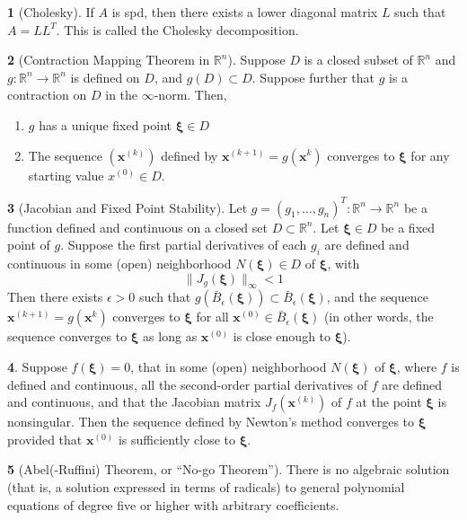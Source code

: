 \documentclass[12pt]{article}
\theoremstyle{definition}
\newtheorem{theorem}{\color{ForestGreen}{\textbf{Theorem}}}
\newcommand{\e}{\epsilon}
\newcommand{\R}{\mathbb{R}}
\newcommand{\norm}[1]{\lVert#1\rVert}
\newcommand{\x}{\bm{x}}
\newcommand{\xib}{\bm{\xi}}
\begin{document}
\begin{theorem}[Cholesky]
If $A$ is spd, then there exists a lower diagonal matrix $L$ such that $A = L L^T$. This is called the Cholesky decomposition.
\end{theorem}

\begin{theorem}[Contraction Mapping Theorem in $\R^n$]
Suppose $D$ is a closed subset of $\R^n$ and $g: \R^n \to \R^n$ is defined on $D$, and $g(D) \subset D$. Suppose further that $g$ is a contraction on $D$ in the $\infty$-norm. Then,
\begin{enumerate}
\item $g$ has a unique fixed point $\xib \in D$
\item The sequence $(\x^{(k)})$ defined by $\x^{(k+1)} = g(\x^{k})$ converges to $\xib$ for any starting value $x^{(0)} \in D$.
\end{enumerate}
\end{theorem}

\begin{theorem}[Jacobian and Fixed Point Stability]
Let $g = (g_1, \ldots, g_n)^T : \R^n \to \R^n$ be a function defined and continuous on a closed set $D \subset \R^n$. Let $\xib \in D$ be a fixed point of $g$. Suppose the first partial derivatives of each $g_i$ are defined and continuous in some (open) neighborhood $N(\xib) \in D$ of $\xib$, with
\begin{equation}
\norm{J_g(\xib)}_\infty < 1
\end{equation}
Then there exists $\e > 0$ such that $g (\bar B_\e(\xib)) \subset \bar B_\e(\xib)$, and the sequence $\x^{(k+1)} = g(\x^{k})$ converges to $\xib$ for all $\x^{(0)} \in \bar B_\e(\xib)$ (in other words, the sequence converges to $\xib$ as long as $\x^{(0)}$ is close enough to $\xib$).
\end{theorem}

\begin{theorem}
Suppose $f(\xib) = 0$, that in some (open) neighborhood $N(\xib)$ of $\xib$, where $f$ is defined and continuous, all the second-order partial derivatives of $f$ are defined and continuous, and that the Jacobian matrix $J_f(\x^{(k)})$ of $f$ at the point $\xib$ is nonsingular. Then the sequence defined by Newton's method converges to $\xib$ provided that $\x^{(0)}$ is sufficiently close to $\xib$.
\end{theorem}

\begin{theorem}[Abel(-Ruffini) Theorem, or ``No-go Theorem'']
There is no algebraic solution (that is, a solution expressed in terms of radicals) to general polynomial equations of degree five or higher with arbitrary coefficients.
\end{theorem}
\end{document}
